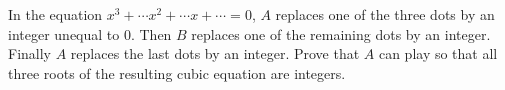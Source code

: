 In the equation $x^3 + \cdots x^2 + \cdots x + \cdots = 0$, $A$ replaces one of the three dots by an integer unequal to $0$. Then $B$ replaces one of the remaining dots by an integer. Finally $A$ replaces the last dots by an integer. Prove that $A$ can play so that all three roots of the resulting cubic equation are integers.
